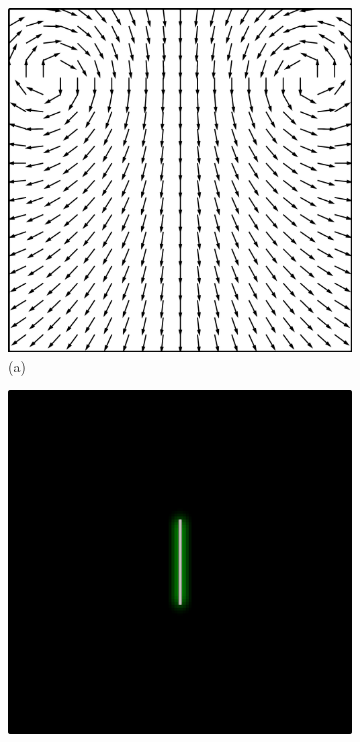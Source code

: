 \begin{figure}[ht]
    \centering
    \begin{subfigure}{.24\textwidth}
        \centering
        \includegraphics[scale=.065]{figures/Coaxing/Glyphs.png}
        \caption*{(a)}
    \end{subfigure}
    \begin{subfigure}{.24\textwidth}
        \centering
        \includegraphics[scale=.065]{figures/Coaxing/SingleLine0.png}

\end{subfigure}
\end{figure}
